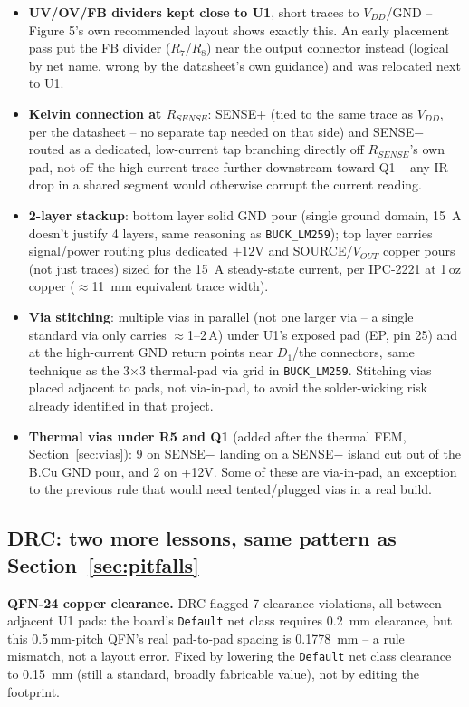 \documentclass[11pt,letterpaper]{article}
\begin{document}
\begin{itemize}
\item \textbf{UV/OV/FB dividers kept close to U1}, short traces to $V_{DD}$/GND -- Figure 5's own
recommended layout shows exactly this. An early placement pass put the FB divider ($R_7$/$R_8$) near the
output connector instead (logical by net name, wrong by the datasheet's own guidance) and was relocated
next to U1.
\item \textbf{Kelvin connection at $R_{SENSE}$}: SENSE+ (tied to the same trace as $V_{DD}$, per the
datasheet -- no separate tap needed on that side) and SENSE$-$ routed as a dedicated, low-current tap
branching directly off $R_{SENSE}$'s own pad, not off the high-current trace further downstream toward Q1
-- any IR drop in a shared segment would otherwise corrupt the current reading.
\item \textbf{2-layer stackup}: bottom layer solid GND pour (single ground domain, \SI{15}{\ampere}
doesn't justify 4 layers, same reasoning as \texttt{BUCK\_LM259}); top layer carries signal/power routing
plus dedicated $+12\text{V}$ and SOURCE/$V_{OUT}$ copper pours (not just traces) sized for the
\SI{15}{\ampere} steady-state current, per IPC-2221 at 1\,oz copper ($\approx$\SI{11}{\milli\meter}
equivalent trace width).
\item \textbf{Via stitching}: multiple vias in parallel (not one larger via -- a single standard via only
carries $\approx$1--2\,A) under U1's exposed pad (EP, pin 25) and at the high-current GND return points
near $D_1$/the connectors, same technique as the \SI{3}{}$\times$\SI{3}{} thermal-pad via grid in
\texttt{BUCK\_LM259}. Stitching vias placed adjacent to pads, not via-in-pad, to avoid the solder-wicking
risk already identified in that project.
\item \textbf{Thermal vias under R5 and Q1} (added after the thermal FEM, Section~\ref{sec:vias}): 9 on
SENSE$-$ landing on a SENSE$-$ island cut out of the B.Cu GND pour, and 2 on +12V. Some of these are
via-in-pad, an exception to the previous rule that would need tented/plugged vias in a real build.
\end{itemize}

\subsection{DRC: two more lessons, same pattern as Section~\ref{sec:pitfalls}}

\textbf{QFN-24 copper clearance.} DRC flagged 7 clearance violations, all between adjacent U1 pads: the
board's \texttt{Default} net class requires \SI{0.2}{\milli\meter} clearance, but this 0.5\,mm-pitch QFN's
real pad-to-pad spacing is \SI{0.1778}{\milli\meter} -- a rule mismatch, not a layout error. Fixed by
lowering the \texttt{Default} net class clearance to \SI{0.15}{\milli\meter} (still a standard, broadly
fabricable value), not by editing the footprint.
\end{document}
